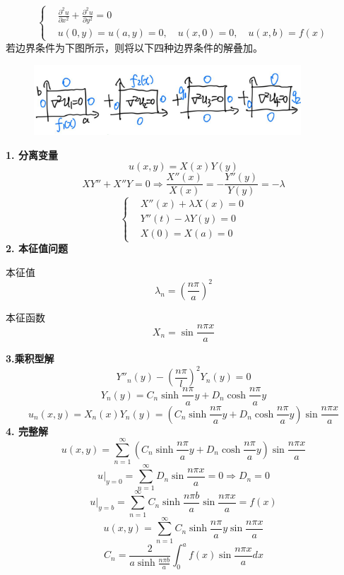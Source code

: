 \begin{ex}[Laplace方程]
$$\left\{
\begin{aligned}
&\frac{\partial^2{u}}{\partial{x}^2}+\frac{\partial^2{u}}{\partial{y}^2}=0\\
&u(0,y)=u(a,y)=0,\quad u(x,0)=0,\quad u(x,b)=f(x)
        \end{aligned}
\right.$$
若边界条件为下图所示，则将以下四种边界条件的解叠加。
\begin{figure}[H]
    \centering 
    \includegraphics[width=10cm]{figures/Rec_HeatTransfer.JPEG} 
    \label{Rec_HeatTransfer}
\end{figure}
\noindent\textbf{1. 分离变量}
    $$u(x,y)=X(x)Y(y)$$
    $$XY''+X''Y=0\Rightarrow\frac{X''(x)}{ X(x)}=-\frac{Y''(y)}{Y(y)}=-\lambda$$
    $$\left\{
\begin{aligned}
    &X''(x)+\lambda X(x)=0\\
    &Y''(t)-\lambda Y(y)=0\\
    &X(0)=X(a)=0
\end{aligned}
\right.$$
\noindent\textbf{2. 本征值问题}

    本征值$$\lambda_n=\left(\frac{n\pi}{a}\right)^2$$

    本征函数$$X_n=\sin\frac{n\pi x}{a}$$

    \noindent\textbf{3.乘积型解}
    $$Y''_n(y)-\left(\frac{n\pi}{l}\right)^2Y_n(y)=0$$
    $$Y_n(y)=C_n\sinh\frac{n\pi}{a}y+D_n\cosh\frac{n\pi}{a}y$$
    $$u_n(x,y)=X_n(x)Y_n(y)=\left(C_n\sinh\frac{n\pi}{a}y+D_n\cosh\frac{n\pi}{a}y\right)\sin\frac{n\pi x}{a}$$
    \noindent\textbf{4. 完整解}
$$u(x,y)=\sum^\infty_{n=1}\left(C_n\sinh\frac{n\pi}{a}y+D_n\cosh\frac{n\pi}{a}y\right)\sin\frac{n\pi x}{a}$$
  $$u|_{y=0}=\sum_{n=1}^\infty D_n\sin\frac{n\pi x}{a}=0\Rightarrow D_n=0$$
  $$u|_{y=b}=\sum_{n=1}^\infty C_n\sinh\frac{n\pi b}{a}\sin\frac{n\pi x}{a}=f(x)$$
$$u(x,y)=\sum^\infty_{n=1}C_n\sinh\frac{n\pi}{a}y\sin\frac{n\pi x}{a}$$
$$C_n=\frac{2}{a\sinh\frac{n\pi b}{a}}\int_0^af(x)\sin\frac{n\pi x}{a}dx$$
\end{ex}

